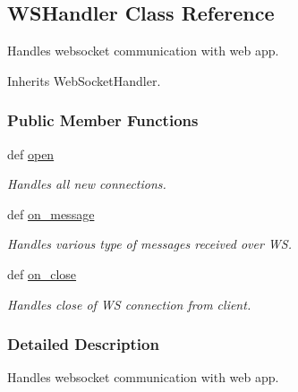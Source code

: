 \hypertarget{classserver_1_1_w_s_handler}{\subsection{W\+S\+Handler Class Reference}
\label{classserver_1_1_w_s_handler}
}


Handles websocket communication with web app.  




Inherits Web\+Socket\+Handler.

\subsubsection*{Public Member Functions}
\begin{DoxyCompactItemize}
\item 
def \hyperlink{classserver_1_1_w_s_handler_ae4b82667a73596ae2d8042e9b4be8a95}{open}
\begin{DoxyCompactList}\small\item\em Handles all new connections. \end{DoxyCompactList}\item 
def \hyperlink{classserver_1_1_w_s_handler_a7618f0d180e9433d4fda68fdcc77b883}{on\+\_\+message}
\begin{DoxyCompactList}\small\item\em Handles various type of messages received over W\+S. \end{DoxyCompactList}\item 
\hypertarget{classserver_1_1_w_s_handler_a278f5ae83d49aaff3f84e571d3af6f47}{def \hyperlink{classserver_1_1_w_s_handler_a278f5ae83d49aaff3f84e571d3af6f47}{on\+\_\+close}}\label{classserver_1_1_w_s_handler_a278f5ae83d49aaff3f84e571d3af6f47}

\begin{DoxyCompactList}\small\item\em Handles close of W\+S connection from client. \end{DoxyCompactList}\end{DoxyCompactItemize}


\subsubsection{Detailed Description}
Handles websocket communication with web app. 

